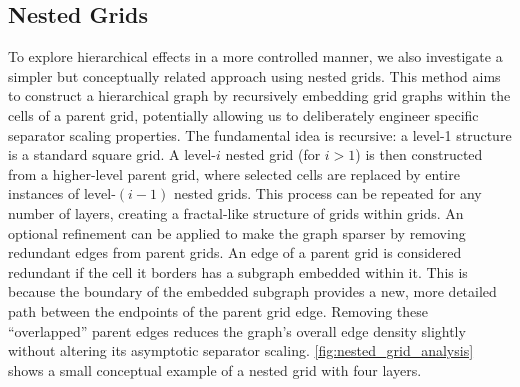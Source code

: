 \subsection{Nested Grids}

To explore hierarchical effects in a more controlled manner, we also investigate a simpler but conceptually related approach using nested grids.
This method aims to construct a hierarchical graph by recursively embedding grid graphs within the cells of a parent grid, potentially allowing us to deliberately engineer specific separator scaling properties.
The fundamental idea is recursive: a level-1 structure is a standard square grid.
A level-\(i\) nested grid (for \(i > 1\)) is then constructed from a higher-level parent grid, where selected cells are replaced by entire instances of level-\((i-1)\) nested grids.
This process can be repeated for any number of layers, creating a fractal-like structure of grids within grids.
An optional refinement can be applied to make the graph sparser by removing redundant edges from parent grids.
An edge of a parent grid is considered redundant if the cell it borders has a subgraph embedded within it.
This is because the boundary of the embedded subgraph provides a new, more detailed path between the endpoints of the parent grid edge.
Removing these \enquote{overlapped} parent edges reduces the graph's overall edge density slightly without altering its asymptotic separator scaling.
\cref{fig:nested_grid_analysis} shows a small conceptual example of a nested grid with four layers.

